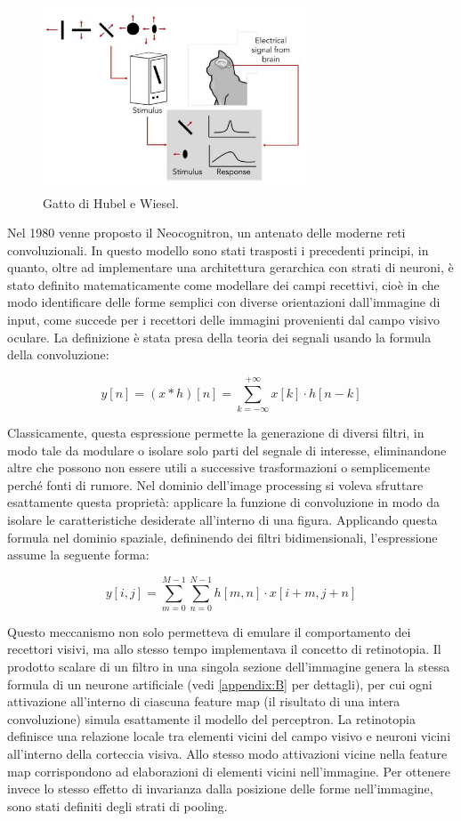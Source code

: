 \begin{figure}[htbp]
    \centering
    \includegraphics[width=0.7\textwidth]{figures/Hubel_and_Wiesel_cat.png}
    \caption{Gatto di Hubel e Wiesel.}
    \label{fig:chatto}
\end{figure}


Nel 1980 venne proposto il Neocognitron, un antenato delle moderne reti convoluzionali. In questo modello sono stati trasposti i precedenti principi, in quanto, oltre ad implementare una architettura gerarchica con strati di neuroni, è stato definito matematicamente come modellare dei campi recettivi, cioè in che modo identificare delle forme semplici con diverse orientazioni dall'immagine di input, come succede per i recettori delle immagini provenienti dal campo visivo oculare. La definizione è stata presa della teoria dei segnali usando la formula della convoluzione: 

\[
y[n] = (x * h)[n] = \sum_{k=-\infty}^{+\infty} x[k] \cdot h[n - k]
\]


Classicamente, questa espressione permette la generazione di diversi filtri, in modo tale da modulare o isolare solo parti del segnale di interesse, eliminandone altre che possono non essere utili a successive trasformazioni o semplicemente perché fonti di rumore. Nel dominio dell'image processing si voleva sfruttare esattamente questa proprietà: applicare la funzione di convoluzione in modo da isolare le caratteristiche desiderate all'interno di una figura. Applicando questa formula nel dominio spaziale, defininendo dei filtri bidimensionali, l'espressione assume la seguente forma: 

\[
y[i,j] = \sum_{m=0}^{M-1} \sum_{n=0}^{N-1} h[m,n] \cdot x[i + m, j + n]
\]

Questo meccanismo non solo permetteva di emulare il comportamento dei recettori visivi, ma allo stesso tempo implementava il concetto di retinotopia. Il prodotto scalare di un filtro in una singola sezione dell'immagine genera la stessa formula di un neurone artificiale (vedi \autoref{appendix:B} per dettagli), per cui ogni attivazione all'interno di ciascuna feature map (il risultato di una intera convoluzione) simula esattamente il modello del perceptron. La retinotopia definisce una relazione locale tra elementi vicini del campo visivo e neuroni vicini all'interno della corteccia visiva. Allo stesso modo attivazioni vicine nella feature map corrispondono ad elaborazioni di elementi vicini nell'immagine. Per ottenere invece lo stesso effetto di invarianza dalla posizione delle forme nell'immagine, sono stati definiti degli strati di pooling. 

